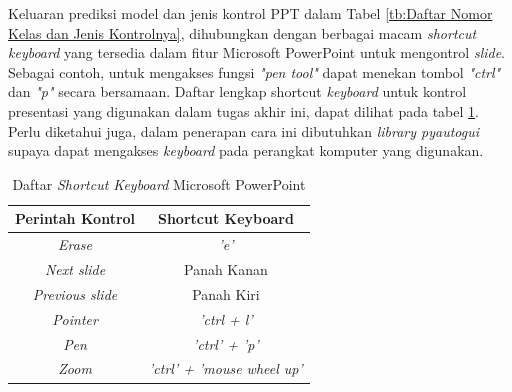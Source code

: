 Keluaran prediksi model dan jenis kontrol PPT dalam Tabel \ref{tb:Daftar Nomor Kelas dan Jenis Kontrolnya}, dihubungkan dengan berbagai macam \emph{shortcut keyboard} yang tersedia dalam fitur Microsoft PowerPoint untuk mengontrol \emph{slide}. Sebagai contoh, untuk mengakses fungsi \emph{"pen tool"} dapat menekan tombol \emph{"ctrl"} dan \emph{"p"} secara bersamaan. Daftar lengkap shortcut \emph{keyboard} untuk kontrol presentasi yang digunakan dalam tugas akhir ini, dapat dilihat pada tabel \ref{tb: daftarshortcutkeyboardmicrosoftpowerpoint}. Perlu diketahui juga, dalam penerapan cara ini dibutuhkan \emph{library pyautogui} supaya dapat mengakses \emph{keyboard} pada perangkat komputer yang digunakan. 

\begin{longtable}{|c|c|}
  \caption{Daftar \emph{Shortcut Keyboard} Microsoft PowerPoint}
  \label{tb: daftarshortcutkeyboardmicrosoftpowerpoint}\\
  \hline
  \textbf{Perintah Kontrol} & \textbf{Shortcut Keyboard} \\
  \hline
  \endhead
  \emph{Erase}   & \emph{'e'}  \\
  \emph{Next slide}   & Panah Kanan  \\
  \emph{Previous slide}   & Panah Kiri  \\
  \hline
  \emph{Pointer}   & \emph{'ctrl + l'}  \\
  \emph{Pen}   & \emph{'ctrl' + 'p'}  \\
  \emph{Zoom}   & \emph{'ctrl' + 'mouse wheel up'}  \\
  \hline
\end{longtable}



